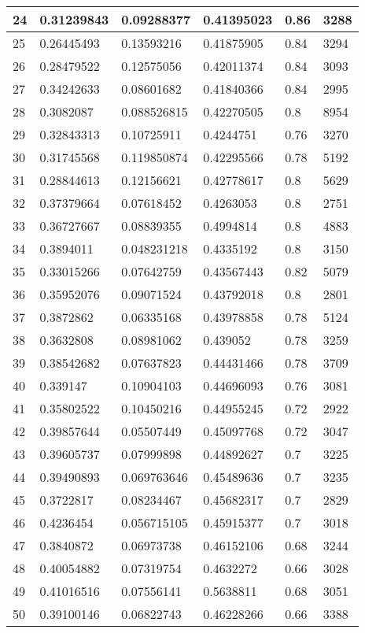 \begin{longtable}{|l|l|l|l|l|l|}
24 & 0.31239843 & 0.09288377 & 0.41395023 & 0.86 & 3288 \\ \hline 
25 & 0.26445493 & 0.13593216 & 0.41875905 & 0.84 & 3294 \\ \hline 
26 & 0.28479522 & 0.12575056 & 0.42011374 & 0.84 & 3093 \\ \hline 
27 & 0.34242633 & 0.08601682 & 0.41840366 & 0.84 & 2995 \\ \hline 
28 & 0.3082087 & 0.088526815 & 0.42270505 & 0.8 & 8954 \\ \hline 
29 & 0.32843313 & 0.10725911 & 0.4244751 & 0.76 & 3270 \\ \hline 
30 & 0.31745568 & 0.119850874 & 0.42295566 & 0.78 & 5192 \\ \hline 
31 & 0.28844613 & 0.12156621 & 0.42778617 & 0.8 & 5629 \\ \hline 
32 & 0.37379664 & 0.07618452 & 0.4263053 & 0.8 & 2751 \\ \hline 
33 & 0.36727667 & 0.08839355 & 0.4994814 & 0.8 & 4883 \\ \hline 
34 & 0.3894011 & 0.048231218 & 0.4335192 & 0.8 & 3150 \\ \hline 
35 & 0.33015266 & 0.07642759 & 0.43567443 & 0.82 & 5079 \\ \hline 
36 & 0.35952076 & 0.09071524 & 0.43792018 & 0.8 & 2801 \\ \hline 
37 & 0.3872862 & 0.06335168 & 0.43978858 & 0.78 & 5124 \\ \hline 
38 & 0.3632808 & 0.08981062 & 0.439052 & 0.78 & 3259 \\ \hline 
39 & 0.38542682 & 0.07637823 & 0.44431466 & 0.78 & 3709 \\ \hline 
40 & 0.339147 & 0.10904103 & 0.44696093 & 0.76 & 3081 \\ \hline 
41 & 0.35802522 & 0.10450216 & 0.44955245 & 0.72 & 2922 \\ \hline 
42 & 0.39857644 & 0.05507449 & 0.45097768 & 0.72 & 3047 \\ \hline 
43 & 0.39605737 & 0.07999898 & 0.44892627 & 0.7 & 3225 \\ \hline 
44 & 0.39490893 & 0.069763646 & 0.45489636 & 0.7 & 3235 \\ \hline 
45 & 0.3722817 & 0.08234467 & 0.45682317 & 0.7 & 2829 \\ \hline 
46 & 0.4236454 & 0.056715105 & 0.45915377 & 0.7 & 3018 \\ \hline 
47 & 0.3840872 & 0.06973738 & 0.46152106 & 0.68 & 3244 \\ \hline 
48 & 0.40054882 & 0.07319754 & 0.4632272 & 0.66 & 3028 \\ \hline 
49 & 0.41016516 & 0.07556141 & 0.5638811 & 0.68 & 3051 \\ \hline 
50 & 0.39100146 & 0.06822743 & 0.46228266 & 0.66 & 3388 \\ \hline 
\end{longtable}